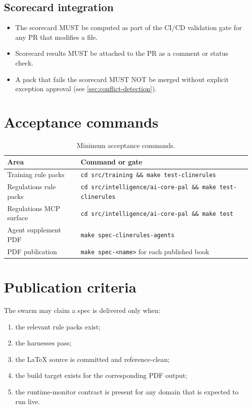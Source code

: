 \documentclass[11pt,a4paper,twoside]{report}
\newcommand{\filepath}[1]{{\color{pathcolor}\path{#1}}}
\begin{document}
\subsection{Scorecard integration}

\begin{itemize}
\item The scorecard MUST be computed as part of the CI/CD validation
gate for any PR that modifies a \filepath{.clinerules} file.
\item Scorecard results MUST be attached to the PR as a comment or
status check.
\item A pack that fails the scorecard MUST NOT be merged without
explicit exception approval (see \cref{sec:conflict-detection}).
\end{itemize}

\section{Acceptance commands}

\begin{table}[htbp]
\centering
\footnotesize
\caption{Minimum acceptance commands.}
\label{tab:acceptance}
\begin{tabularx}{\textwidth}{@{}l X@{}}
\toprule
\textbf{Area} & \textbf{Command or gate} \\
\midrule
Training rule packs & \texttt{cd src/training \&\& make test-clinerules} \\
Regulations rule packs & \texttt{cd src/intelligence/ai-core-pal \&\& make test-clinerules} \\
Regulations MCP surface & \texttt{cd src/intelligence/ai-core-pal \&\& make test} \\
Agent supplement PDF & \texttt{make spec-clinerules-agents} \\
PDF publication & \texttt{make spec-<name>} for each published book \\
\bottomrule
\end{tabularx}
\end{table}

\section{Publication criteria}

The swarm may claim a spec is delivered only when:
\begin{enumerate}
\item the relevant rule packs exist;
\item the harnesses pass;
\item the LaTeX source is committed and reference-clean;
\item the build target exists for the corresponding PDF output;
\item the runtime-monitor contract is present for any domain that is
expected to run live.
\end{enumerate}
\end{document}

